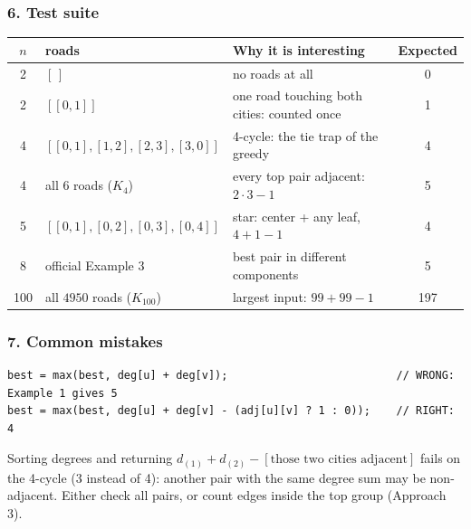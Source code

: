 \subsubsection*{6. Test suite}

\begin{testbox}
\centering\small
\begin{tabular}{@{}cllc@{}}
\toprule
$n$ & \textbf{roads} & \textbf{Why it is interesting} & \textbf{Expected} \\
\midrule
2 & $[\,]$ & no roads at all & 0 \\
2 & $[[0,1]]$ & one road touching both cities: counted once & 1 \\
4 & $[[0,1],[1,2],[2,3],[3,0]]$ & 4-cycle: the tie trap of the greedy & 4 \\
4 & all 6 roads ($K_4$) & every top pair adjacent: $2\cdot3-1$ & 5 \\
5 & $[[0,1],[0,2],[0,3],[0,4]]$ & star: center + any leaf, $4 + 1 - 1$ & 4 \\
8 & official Example 3 & best pair in different components & 5 \\
100 & all $4950$ roads ($K_{100}$) & largest input: $99 + 99 - 1$ & 197 \\
\bottomrule
\end{tabular}
\end{testbox}

\subsubsection*{7. Common mistakes}

\begin{warningbox}
\begin{lstlisting}[style=snippet]
best = max(best, deg[u] + deg[v]);                          // WRONG: Example 1 gives 5
best = max(best, deg[u] + deg[v] - (adj[u][v] ? 1 : 0));    // RIGHT: 4
\end{lstlisting}
\end{warningbox}

\begin{warningbox}
Sorting degrees and returning $d_{(1)} + d_{(2)} - [\text{those two cities adjacent}]$ fails on the 4-cycle (3 instead of 4): another pair with the same degree sum may be non-adjacent. Either check all pairs, or count edges inside the top group (Approach 3).
\end{warningbox}

